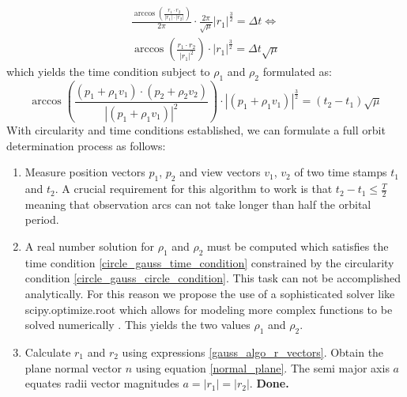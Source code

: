 \documentclass[11pt,a4paper]{article}
\begin{document}
	\begin{equation*}
		\begin{aligned}
			\frac{\arccos\left(\frac{r_1\cdot r_2}{|r_1|\cdot|r_2|}\right)}{2\pi}\cdot
			\frac{2\pi}{\sqrt{\mu}}|r_1|^{\frac{3}{2}}=
			\Delta t \Leftrightarrow \\
			\arccos\left(\frac{r_1\cdot r_2}{|r_1|^2}\right)\cdot|r_1|^{\frac{3}{2}}=\Delta t\sqrt{\mu}
		\end{aligned}
	\end{equation*}
	which yields the time condition subject to $\rho_1$ and $\rho_2$ formulated as:
	\begin{equation}
		\label{circle_gauss_time_condition}
		\boxed{\arccos\left(\frac{(p_1+\rho_1v_1)\cdot (p_2+\rho_2v_2)}{|(p_1+\rho_1v_1)|^2}\right)\cdot|(p_1+\rho_1v_1)|^{\frac{3}{2}}=(t_2-t_1)\sqrt{\mu}}
	\end{equation}
	\noindent
	With circularity and time conditions established, we can formulate a full orbit determination process as follows:
	
	\begin{enumerate}
		\item Measure position vectors $p_1$, $p_2$ and view vectors $v_1$, $v_2$ of two time stamps $t_1$ and $t_2$. A crucial requirement for this algorithm to work is that $t_2 - t_1 \leq \frac{T}{2}$ meaning that observation arcs can not take longer than half the orbital period.
		\item A real number solution for $\rho_1$ and $\rho_2$ must be computed which satisfies the time condition \ref{circle_gauss_time_condition} constrained by the circularity condition \ref{circle_gauss_circle_condition}. This task can not be accomplished analytically. For this reason we propose the use of a sophisticated solver like scipy.optimize.root which allows for modeling more complex functions to be solved numerically \cite{scipy_roots}. This yields the two values $\rho_1$ and $\rho_2$.
		\item Calculate $r_1$ and $r_2$ using expressions \ref{gauss_algo_r_vectors}. Obtain the plane normal vector $n$ using equation \ref{normal_plane}. The semi major axis $a$ equates radii vector magnitudes $a=|r_1|=|r_2|$.\newline
		\textbf{Done.}
	\end{enumerate}
	\newpage
	
\end{document}
